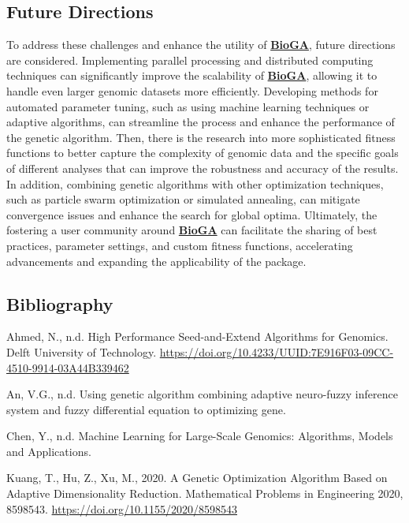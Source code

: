 \documentclass[
]{article}
\begin{document}
\subsection{Future Directions}\label{future-directions}

To address these challenges and enhance the utility of
\href{https://doi.org/doi:10.18129/B9.bioc.BioGA}{\textbf{BioGA}},
future directions are considered. Implementing parallel processing and
distributed computing techniques can significantly improve the
scalability of
\href{https://doi.org/doi:10.18129/B9.bioc.BioGA}{\textbf{BioGA}},
allowing it to handle even larger genomic datasets more efficiently.
Developing methods for automated parameter tuning, such as using machine
learning techniques or adaptive algorithms, can streamline the process
and enhance the performance of the genetic algorithm. Then, there is the
research into more sophisticated fitness functions to better capture the
complexity of genomic data and the specific goals of different analyses
that can improve the robustness and accuracy of the results. In
addition, combining genetic algorithms with other optimization
techniques, such as particle swarm optimization or simulated annealing,
can mitigate convergence issues and enhance the search for global
optima. Ultimately, the fostering a user community around
\href{https://doi.org/doi:10.18129/B9.bioc.BioGA}{\textbf{BioGA}} can
facilitate the sharing of best practices, parameter settings, and custom
fitness functions, accelerating advancements and expanding the
applicability of the package.

\subsection{Bibliography}\label{bibliography}

Ahmed, N., n.d. High Performance Seed-and-Extend Algorithms for
Genomics. Delft University of Technology.
\url{https://doi.org/10.4233/UUID:7E916F03-09CC-4510-9914-03A44B339462}

An, V.G., n.d. Using genetic algorithm combining adaptive neuro-fuzzy
inference system and fuzzy differential equation to optimizing gene.

Chen, Y., n.d. Machine Learning for Large-Scale Genomics: Algorithms,
Models and Applications.

Kuang, T., Hu, Z., Xu, M., 2020. A Genetic Optimization Algorithm Based
on Adaptive Dimensionality Reduction. Mathematical Problems in
Engineering 2020, 8598543. \url{https://doi.org/10.1155/2020/8598543}
\end{document}
